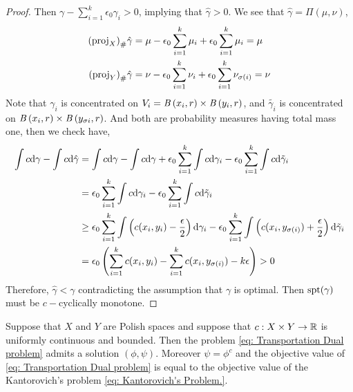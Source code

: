 \begin{proof}
Then $\gamma-\sum_{i=1}^{k}\epsilon_0\gamma_i>0$, implying that $\hat\gamma>0$. We see that $\hat{\gamma}=\Pi(\mu, \nu)$,
\begin{align*}
	{(\mathrm{proj}_X)}_{\#} \hat\gamma&=\mu-\epsilon_0\sum_{i=1}^{k}\mu_i+\epsilon_0\sum_{i=1}^{k}\mu_i=\mu  \\
	{(\mathrm{proj}_Y)}_{\#} \hat\gamma&=\nu-\epsilon_0\sum_{i=1}^{k}\nu_i+\epsilon_0\sum_{i=1}^{k}\nu_{\sigma(i)}=\nu
\end{align*}
Note that $\gamma_i$ is concentrated on $V_i=\mathit{B}\left( x_i, r \right)\times\mathit{B}\left( y_i, r \right)$, and $\tilde{\gamma_i}$ is concentrated on $\mathit{B}\left( x_i, r \right)\times\mathit{B}\left( y_{\sigma{i}}, r \right)$. And both are probability measures having total mass one, then we check have,
\begin{align*}
	\int c\mathrm{d} \gamma - \int c\mathrm{d} \hat \gamma &=\int c\mathrm{d}\gamma -\int c \mathrm{d}\gamma+\epsilon_0\sum_{i=1}^{k}\int c\mathrm{d}\gamma_i-\epsilon_0\sum_{i=1}^{k}\int c\mathrm{d}\tilde\gamma_i\\
	&=\epsilon_0\sum_{i=1}^{k}\int c\mathrm{d}\gamma_i-\epsilon_0\sum_{i=1}^{k}\int c\mathrm{d}\tilde\gamma_i\\
	&\geq\epsilon_0\sum_{i=1}^{k}\int\left( c(x_i, y_i)-\frac{\epsilon}{2} \right)\mathrm{d}\gamma_i-\epsilon_0\sum_{i=1}^{k}\int \left( c(x_i, y_{\sigma(i)})+\frac{\epsilon}{2} \right)\mathrm{d}\tilde\gamma_i\\
	&=\epsilon_0\left( \sum_{i=1}^{k}c(x_i, y_i)-\sum_{i=1}^{k} c(x_i, y_{\sigma(i)})-k\epsilon \right)>0
\end{align*}
Therefore, $\hat{\gamma}<\gamma$ contradicting the assumption that $\gamma$ is optimal. Then $\mathrm{spt}(\gamma)$ must be $c-$cyclically monotone. 
\end{proof}

\begin{theorem}
	Suppose that $X$ and $Y$ are Polish spaces and suppose that $c:X\times Y\rightarrow \mathbb{R}$ is uniformly continuous  and bounded. Then the problem \eqref{eq: Transportation Dual problem} admits a solution $\left(\phi, \psi\right)$. Moreover $\psi=\phi^c$ and the objective value of \eqref{eq: Transportation Dual problem} is equal to the objective value of the Kantorovich's problem \eqref{eq: Kantorovich's Problem.}. 
\end{theorem}

